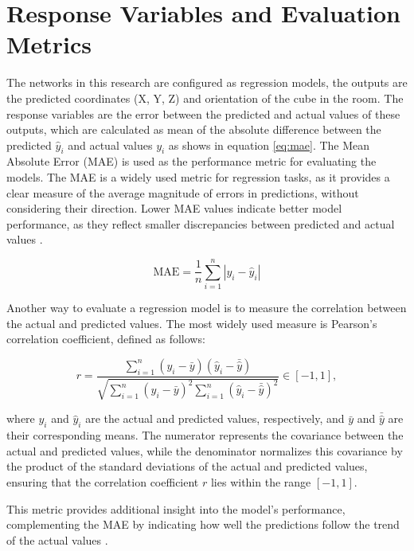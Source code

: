 \section{Response Variables and Evaluation Metrics}

The networks in this research are configured as regression models, the outputs are the predicted coordinates (X, Y, Z) and orientation of the cube in the room. The response variables are the error between the predicted and actual values of these outputs, which are calculated as mean of the absolute difference between the predicted \(\hat{y}_i\)  and actual values \(y_i\) as shows in equation \ref{eq:mae}. The Mean Absolute Error (MAE) is used as the performance metric for evaluating the models. The MAE is a widely used metric for regression tasks, as it provides a clear measure of the average magnitude of errors in predictions, without considering their direction. Lower MAE values indicate better model performance, as they reflect smaller discrepancies between predicted and actual values \cite{friedmanrecomendation}.


\begin{equation}
\label{eq:mae}
\text{MAE} = \frac{1}{n} \sum_{i=1}^{n} |y_i - \hat{y}_i|
\end{equation}


Another way to evaluate a regression model is to measure the correlation between the actual and predicted values. The most widely used measure is Pearson’s correlation coefficient, defined as follows:

\begin{equation}
\label{eq:pearson}
r = \frac{\sum_{i=1}^{n} (y_i - \bar{y})(\hat{y}_i - \bar{\hat{y}})}{\sqrt{\sum_{i=1}^{n} (y_i - \bar{y})^2 \sum_{i=1}^{n} (\hat{y}_i - \bar{\hat{y}})^2}} \in [-1, 1],
\end{equation}

where \(y_i\) and \(\hat{y}_i\) are the actual and predicted values, respectively, and \(\bar{y}\) and \(\bar{\hat{y}}\) are their corresponding means. The numerator represents the covariance between the actual and predicted values, while the denominator normalizes this covariance by the product of the standard deviations of the actual and predicted values, ensuring that the correlation coefficient \(r\) lies within the range \([-1, 1]\).

This metric provides additional insight into the model's performance, complementing the MAE by indicating how well the predictions follow the trend of the actual values \cite{friedmanrecomendation}.


